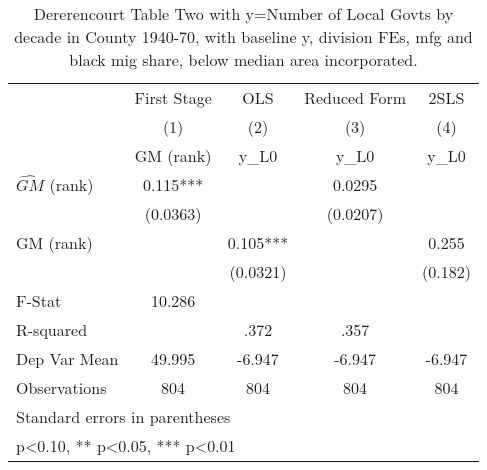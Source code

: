 \begin{table}[htbp]\centering
\def\sym#1{\ifmmode^{#1}\else\(^{#1}\)\fi}
\caption{Dererencourt Table Two with y=Number of Local Govts by decade in County 1940-70, with baseline y, division FEs, mfg and black mig share, below median area incorporated.}
\begin{tabular}{l*{4}{c}}
\toprule
                    & First Stage   &         OLS   &Reduced Form   &        2SLS   \\
                    &\multicolumn{1}{c}{(1)}&\multicolumn{1}{c}{(2)}&\multicolumn{1}{c}{(3)}&\multicolumn{1}{c}{(4)}\\
                    &\multicolumn{1}{c}{GM  (rank)}&\multicolumn{1}{c}{y\_L0}&\multicolumn{1}{c}{y\_L0}&\multicolumn{1}{c}{y\_L0}\\
\midrule
$\hat{GM}$ (rank)   &       0.115***&               &      0.0295   &               \\
                    &    (0.0363)   &               &    (0.0207)   &               \\
\addlinespace
GM  (rank)          &               &       0.105***&               &       0.255   \\
                    &               &    (0.0321)   &               &     (0.182)   \\
\midrule
F-Stat              &      10.286   &               &               &               \\
R-squared           &               &        .372   &        .357   &               \\
Dep Var Mean        &      49.995   &      -6.947   &      -6.947   &      -6.947   \\
Observations        &         804   &         804   &         804   &         804   \\
\bottomrule
\multicolumn{5}{l}{\footnotesize Standard errors in parentheses}\\
\multicolumn{5}{l}{\footnotesize * p<0.10, ** p<0.05, *** p<0.01}\\
\end{tabular}
\end{table}
